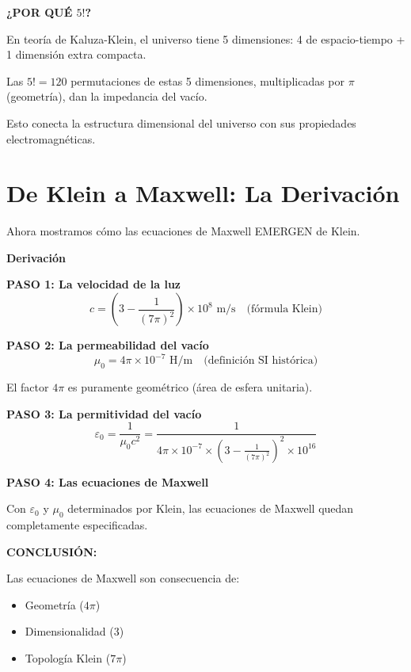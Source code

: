 \textbf{¿POR QUÉ $5!$?}

En teoría de Kaluza-Klein, el universo tiene 5 dimensiones:
4 de espacio-tiempo + 1 dimensión extra compacta.

Las $5! = 120$ permutaciones de estas 5 dimensiones, multiplicadas
por $\pi$ (geometría), dan la impedancia del vacío.

Esto conecta la estructura dimensional del universo con sus
propiedades electromagnéticas.


\section{De Klein a Maxwell: La Derivación}

Ahora mostramos cómo las ecuaciones de Maxwell EMERGEN de Klein.

\begin{nivelmatematico}
\textbf{Derivación}

\textbf{PASO 1: La velocidad de la luz}
\begin{equation}
c = \left(3 - \frac{1}{(7\pi)^2}\right) \times 10^8 \text{ m/s} \quad \text{(fórmula Klein)}
\end{equation}

\textbf{PASO 2: La permeabilidad del vacío}
\begin{equation}
\mu_0 = 4\pi \times 10^{-7} \text{ H/m} \quad \text{(definición SI histórica)}
\end{equation}

El factor $4\pi$ es puramente geométrico (área de esfera unitaria).

\textbf{PASO 3: La permitividad del vacío}
\begin{equation}
\varepsilon_0 = \frac{1}{\mu_0 c^2} = \frac{1}{4\pi \times 10^{-7} \times \left(3 - \frac{1}{(7\pi)^2}\right)^2 \times 10^{16}}
\end{equation}

\textbf{PASO 4: Las ecuaciones de Maxwell}

Con $\varepsilon_0$ y $\mu_0$ determinados por Klein, las ecuaciones de Maxwell
quedan completamente especificadas.

\textbf{CONCLUSIÓN:}

Las ecuaciones de Maxwell son consecuencia de:
\begin{itemize}
    \item Geometría ($4\pi$)
    \item Dimensionalidad (3)
    \item Topología Klein ($7\pi$)
\end{itemize}
\end{nivelmatematico}

